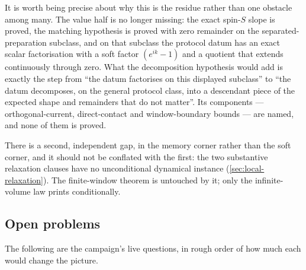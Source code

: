 It is worth being precise about why this is the residue rather than one
obstacle among many. The value half is no longer missing: the exact spin-$S$
slope is proved, the matching hypothesis is proved with zero remainder on the
separated-preparation subclass, and on that subclass the protocol datum has an
exact scalar factorisation with a soft factor $(e^{ik}-1)$ and a quotient that
extends continuously through zero. What the decomposition hypothesis would
add is exactly the step from ``the datum factorises on this displayed
subclass'' to ``the datum decomposes, on the general protocol class, into a
descendant piece of the expected shape and remainders that do not matter''.
Its components --- orthogonal-current, direct-contact and window-boundary
bounds --- are named, and none of them is proved.

There is a second, independent gap, in the memory corner rather than the soft
corner, and it should not be conflated with the first: the two substantive
relaxation clauses have no unconditional dynamical instance
(\cref{sec:local-relaxation}). The finite-window theorem is untouched by it;
only the infinite-volume law prints conditionally.

\subsection{Open problems}

The following are the campaign's live questions, in rough order of how much
each would change the picture.

